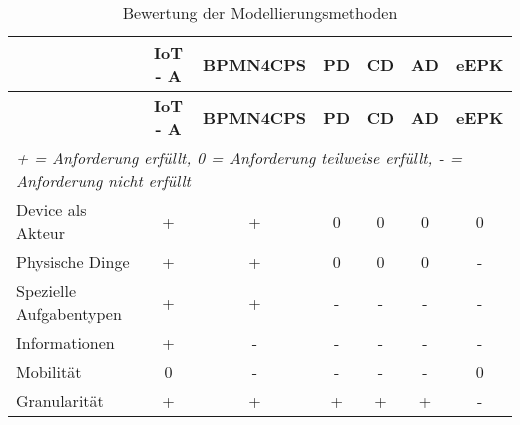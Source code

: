  \begin{longtable}{| l |c|c|c|c|c|c|}
  \caption{Bewertung der Modellierungsmethoden}\\ \hline
  \label{table:Evaluierung}
   & \textbf{IoT - A} & \textbf{BPMN4CPS} & \textbf{PD}\footnotemark[1] & \textbf{CD}\footnotemark[2] & \textbf{AD}\footnotemark[3] &\textbf{eEPK}  \\\hline
  \endfirsthead %

  & \textbf{IoT - A} & \textbf{BPMN4CPS} & \textbf{PD}\footnotemark[1] & \textbf{CD}\footnotemark[2] & \textbf{AD}\footnotemark[3] &\textbf{eEPK} \\ \hline
  \endhead %
  \multicolumn{7}{P{10.8cm}}{\textit{+ = Anforderung erfüllt, 0 = Anforderung teilweise erfüllt, - = Anforderung nicht erfüllt}}\\
  \endlastfoot


  Device als Akteur & +  & + & 0 & 0 & 0 & 0 \\ \hline

  Physische Dinge  & + & + & 0 & 0 & 0 & - \\ \hline

  Spezielle Aufgabentypen & + & + & - & - & -& - \\ \hline

  Informationen  & + & - & - & - & - & - \\ \hline

  Mobilität & 0 & - & - & - & - & 0 \\ \hline

  Granularität & + & + & + & + & + & - \\ \hline

 \end{longtable}
